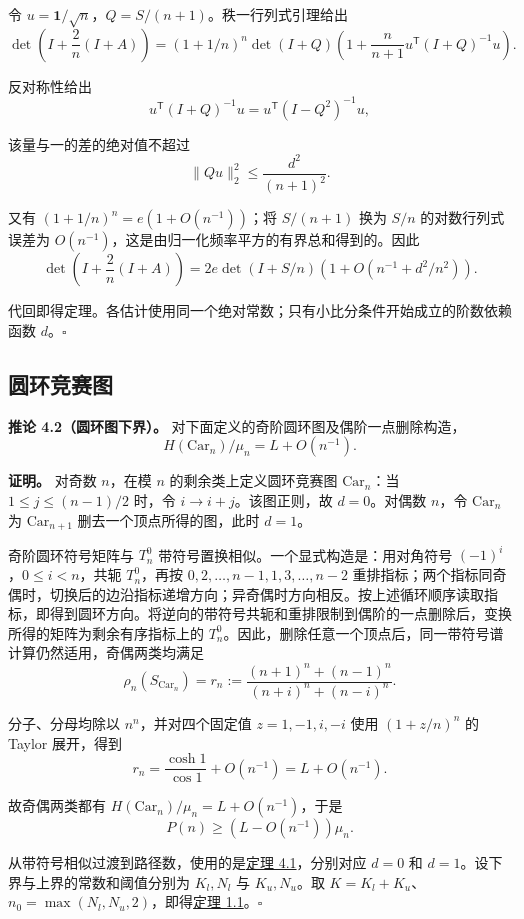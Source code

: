 \documentclass[11pt,a4paper]{article}
\makeatletter
\newcommand{\paperstatement}[3]{\par\addvspace{6pt}\Needspace{4\baselineskip}\phantomsection\def\@currentlabel{#2}\label{#3}\noindent\textbf{#1}\enspace}
\newcommand{\paperref}[2]{\hyperref[#1]{#2}}
\makeatother
\begin{document}
令 \(u=\mathbf1/\sqrt n\)，\(Q=S/(n+1)\)。秩一行列式引理给出
\[\det\left(I+\frac2n(I+A)\right)
=(1+1/n)^n\det(I+Q)
\left(1+\frac n{n+1}u^{\mathsf T}(I+Q)^{-1}u\right).\]

反对称性给出
\[u^{\mathsf T}(I+Q)^{-1}u=u^{\mathsf T}(I-Q^2)^{-1}u,\]

该量与一的差的绝对值不超过
\[\|Qu\|_2^2\le\frac{d^2}{(n+1)^2}.\]

又有 \((1+1/n)^n=e(1+O(n^{-1}))\)；将 \(S/(n+1)\) 换为 \(S/n\) 的对数行列式误差为 \(O(n^{-1})\)，这是由归一化频率平方的有界总和得到的。因此
\[\det\left(I+\frac2n(I+A)\right)
=2e\det(I+S/n)\left(1+O(n^{-1}+d^2/n^2)\right).\]

代回即得定理。各估计使用同一个绝对常数；只有小比分条件开始成立的阶数依赖函数 \(d\)。\nobreak\hspace{.5em}\mbox{$\square$}

\subsection{圆环竞赛图}\label{sec-4.2}

\paperstatement{推论 4.2（圆环图下界）。}{4.2}{thm-4.2} 对下面定义的奇阶圆环图及偶阶一点删除构造，
\[H(\mathrm{Car}_n)/\mu_n=L+O(n^{-1}).\]

\textbf{证明。} 对奇数 \(n\)，在模 \(n\) 的剩余类上定义圆环竞赛图 \(\mathrm{Car}_n\)：当 \(1\le j\le(n-1)/2\) 时，令 \(i\to i+j\)。该图正则，故 \(d=0\)。对偶数 \(n\)，令 \(\mathrm{Car}_n\) 为 \(\mathrm{Car}_{n+1}\) 删去一个顶点所得的图，此时 \(d=1\)。

奇阶圆环符号矩阵与 \(T_n^0\) 带符号置换相似。一个显式构造是：用对角符号 \((-1)^i\)，\(0\le i<n\)，共轭 \(T_n^0\)，再按 \(0,2,\ldots,n-1,1,3,\ldots,n-2\) 重排指标；两个指标同奇偶时，切换后的边沿指标递增方向；异奇偶时方向相反。按上述循环顺序读取指标，即得到圆环方向。将逆向的带符号共轭和重排限制到偶阶的一点删除后，变换所得的矩阵为剩余有序指标上的 \(T_n^0\)。因此，删除任意一个顶点后，同一带符号谱计算仍然适用，奇偶两类均满足
\[\rho_n(S_{\mathrm{Car}_n})
=r_n:=\frac{(n+1)^n+(n-1)^n}{(n+i)^n+(n-i)^n}.\]

分子、分母均除以 \(n^n\)，并对四个固定值 \(z=1,-1,i,-i\) 使用 \((1+z/n)^n\) 的 Taylor 展开，得到
\[r_n=\frac{\cosh1}{\cos1}+O(n^{-1})=L+O(n^{-1}).\]

故奇偶两类都有 \(H(\mathrm{Car}_n)/\mu_n=L+O(n^{-1})\)，于是
\[P(n)\ge(L-O(n^{-1}))\mu_n.\]

从带符号相似过渡到路径数，使用的是\paperref{thm-4.1}{定理 4.1}，分别对应 \(d=0\) 和 \(d=1\)。设下界与上界的常数和阈值分别为 \(K_l,N_l\) 与 \(K_u,N_u\)。取 \(K=K_l+K_u\)、\(n_0=\max(N_l,N_u,2)\)，即得\paperref{thm-1.1}{定理 1.1}。\nobreak\hspace{.5em}\mbox{$\square$}
\end{document}
